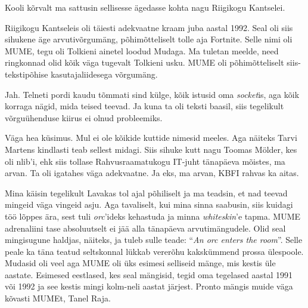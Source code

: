 Kooli kõrvalt ma sattusin sellisesse ägedasse kohta nagu Riigikogu 
Kantselei.


Riigikogu Kantseleis oli täiesti adekvaatne kraam juba aastal 1992. 
Seal oli siis  sihukene  äge arvutivõrgumäng, 
põhimõtteliselt tolle aja Fortnite. Selle nimi oli 
MUME, tegu oli Tolkieni ainetel loodud 
Mudaga. Ma tuletan meelde, need ringkonnad olid kõik väga 
tugevalt Tolkieni usku. MUME oli  põhimõtteliselt siis-tekstipõhise 
kasutajaliidesega võrgumäng. 


Jah. Telneti pordi kaudu tõmmati sind külge,  kõik istusid oma 
\emph{socket}is, aga kõik korraga nägid, mida teised teevad. Ja kuna ta oli 
teksti baasil, siis tegelikult võrguühenduse kiirus ei olnud probleemiks.


Väga hea küsimus. Mul ei ole kõikide kuttide nimesid meeles. Aga näiteks Tarvi 
Martens kindlasti teab sellest midagi. Siis sihuke 
kutt nagu Toomas Mölder, kes oli nlib'i, ehk siis 
tollase Rahvusraamatukogu IT-juht  tänapäeva mõistes, ma arvan. Ta oli igatahes 
väga adekvaatne. Ja eks, ma arvan, KBFI rahvas ka aitas.


Mina käisin tegelikult Lavakas tol ajal põhiliselt ja ma teadsin, et nad teevad 
mingeid väga vingeid asju. Aga tavaliselt, kui mina sinna saabusin, siis 
kuidagi töö lõppes ära, sest tuli \emph{orc}'ideks kehastuda ja minna 
\emph{whiteskin}'e tapma. MUME  adrenaliini tase absoluutselt ei jää alla 
tänapäeva arvutimängudele. Olid seal mingisugune haldjas, näiteks, ja tuleb sulle 
teade: \enquote{\emph{An orc enters the room}}. Selle peale ka täna teatud  
seltskonnal  lükkab vererõhu kakskümmend prossa ülespoole. Mudasid oli veel aga 
MUME oli üks esimesi selliseid mänge, mis kestis üle aastate. Esimesed 
eestlased, kes seal mängisid, tegid oma tegelased aastal 1991 või 1992 ja see 
kestis mingi kolm-neli aastat järjest. Pronto mängis muide 
väga kõvasti MUMEt, Tanel Raja. 

